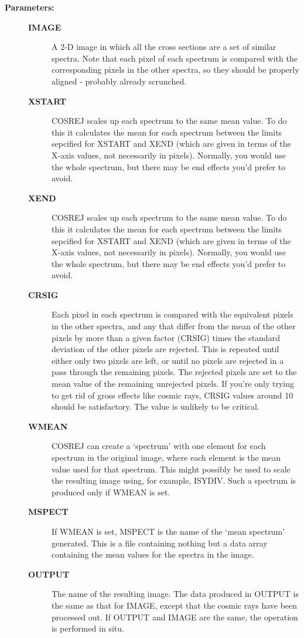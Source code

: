 \begin{description}
\begin{description}
\item [\textbf{Parameters:}]
\begin{description}
\item [\textbf{IMAGE}]
 A 2-D image in which all the cross sections are a
 set of similar spectra.  Note that each pixel of
 each spectrum is compared with the corresponding
 pixels in the other spectra, so they should be
 properly aligned - probably already scrunched.
\item [\textbf{XSTART}]
 COSREJ scales up each spectrum to the same mean value.
 To do this it calculates the mean for each spectrum
 between the limits sepcified for XSTART and XEND (which
 are given in terms of the X-axis values, not necessarily
 in pixels).  Normally, you would use the whole spectrum,
 but there may be end effects you'd prefer to avoid.
\item [\textbf{XEND}]
 COSREJ scales up each spectrum to the same mean value.
 To do this it calculates the mean for each spectrum
 between the limits sepcified for XSTART and XEND (which
 are given in terms of the X-axis values, not necessarily
 in pixels).  Normally, you would use the whole spectrum,
 but there may be end effects you'd prefer to avoid.
\item [\textbf{CRSIG}]
 Each pixel in each spectrum is compared with the equivalent
 pixels in the other spectra, and any that differ from the
 mean of the other pixels by more than a given factor (CRSIG)
 times the standard deviation of the other pixels are
 rejected.  This is repeated until either only two pixels
 are left, or until no pixels are rejected in a pass through
 the remaining pixels.  The rejected pixels are set to the
 mean value of the remaining unrejected pixels.  If you're
 only trying to get rid of gross effects like cosmic rays,
 CRSIG values around 10 should be satisfactory.  The value
 is unlikely to be critical.
\item [\textbf{WMEAN}]
 COSREJ can create a `spectrum' with one element for each
 spectrum in the original image, where each element is
 the mean value used for that spectrum.  This might possibly
 be used to scale the resulting image using, for example,
 ISYDIV.  Such a spectrum is produced only if WMEAN is
 set.
\item [\textbf{MSPECT}]
 If WMEAN is set, MSPECT is the name of the `mean spectrum'
 generated.  This is a file containing nothing but a data
 array containing the mean values for the spectra in the image.
\item [\textbf{OUTPUT}]
 The name of the resulting image. The data produced in
 OUTPUT is the same as that for IMAGE, except that the
 cosmic rays have been processed out.  If OUTPUT and
 IMAGE are the same, the operation is performed in situ.
\end{description}


\end{description}
\end{description}
